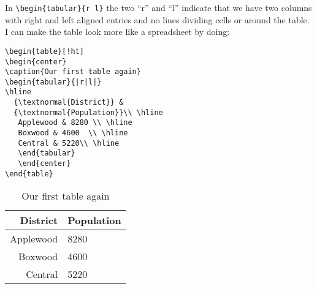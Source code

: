 In \verb|\begin{tabular}{r l}| the two ``r'' and ``l'' indicate that we have two columns with right and left aligned entries and no lines dividing cells or around the table. I can make the table look more like a spreadsheet by doing:
\begin{singlespace}\small
\begin{verbatim}
\begin{table}[!ht]
\begin{center}
\caption{Our first table again}
\begin{tabular}{|r|l|}
\hline
  {\textnormal{District}} &  
  {\textnormal{Population}}\\ \hline
   Applewood & 8280 \\ \hline
   Boxwood & 4600  \\ \hline
   Central & 5220\\ \hline
   \end{tabular}
   \end{center}
\end{table}
\end{verbatim}
\end{singlespace}
\begin{table}[!ht]
\begin{center}
\caption{Our first table again}
\begin{tabular}{|r|l|}
\hline
  {\textnormal{District}} &  
  {\textnormal{Population}}\\ \hline
   Applewood & 8280 \\ \hline
   Boxwood & 4600  \\ \hline
   Central & 5220\\ \hline
   \end{tabular}
   \end{center}
\end{table}

